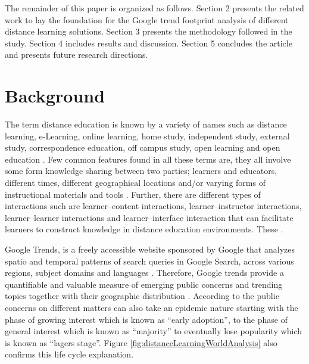 \documentclass[11pt,a4paper,]{article}
\begin{document}
The remainder of this paper is organized as follows. Section 2 presents the related work to lay the foundation for the Google trend footprint analysis of different distance learning solutions. Section 3 presents the methodology followed in the study. Section 4 includes results and discussion. Section 5 concludes the article and presents future research directions.

\hypertarget{background}{%
\section{Background}\label{background}}

The term distance education is known by a variety of names such as distance learning, e-Learning, online learning, home study, independent study, external study, correspondence education, off campus study, open learning and open education \autocite{moore2011learning}. Few common features found in all these terms are, they all involve some form knowledge sharing between two parties; learners and educators, different times, different geographical locations and/or varying forms of instructional materials and tools \autocite{moore2011learning}. Further, there are different types of interactions such are learner--content interactions, learner--instructor interactions, learner--learner interactions and learner--interface interaction that can facilitate learners to construct knowledge in distance education environments. These \autocite{wallace2003online}.

Google Trends, is a freely accessible website sponsored by Google that analyzes spatio and temporal patterns of search queries in Google Search, across various regions, subject domains and languages \autocite{carneiro2009google}. Therefore, Google trends provide a quantifiable and valuable measure of emerging public concerns and trending topics together with their geographic distribution \autocite{alicino2015assessing,cook2011assessing}. According to \textcite{jarynowski2020perception} the public concerns on different matters can also take an epidemic nature starting with the phase of growing interest which is known as ``early adoption'', to the phase of general interest which is known as ``majority'' to eventually lose popularity which is known as ``lagers stage''. Figure \ref{fig:distanceLearningWorldAnalysis} also confirms this life cycle explanation.
\end{document}
